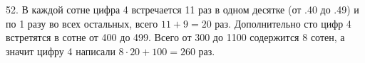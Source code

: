52. В каждой сотне цифра 4 встречается 11 раз в одном десятке (от .40 до .49) и по 1 разу во всех остальных, всего $11+9=20$ раз. Дополнительно сто цифр 4 встретятся в сотне от 400 до 499. Всего от 300 до 1100 содержится 8 сотен, а значит цифру 4 написали $8\cdot20+100=260$ раз.\\
